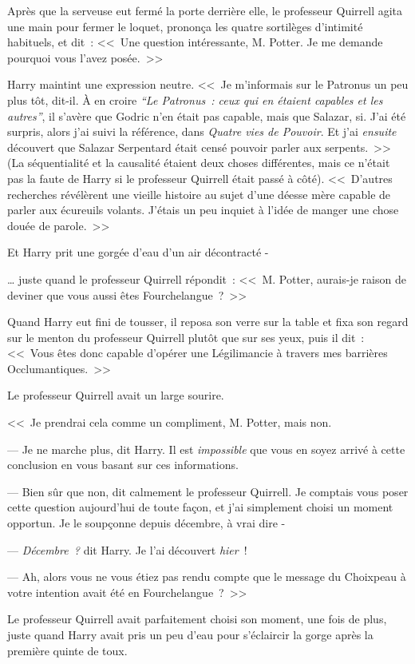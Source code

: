 Après que la serveuse eut fermé la porte derrière elle, le professeur Quirrell agita une main pour fermer le loquet, prononça les quatre sortilèges d'intimité habituels, et dit~: <<~Une question intéressante, M. Potter. Je me demande pourquoi vous l'avez posée.~>>

Harry maintint une expression neutre. <<~Je m'informais sur le Patronus un peu plus tôt, dit-il. À en croire \emph{“Le Patronus~: ceux qui en étaient capables et les autres”}, il s'avère que Godric n'en était pas capable, mais que Salazar, si. J'ai été surpris, alors j'ai suivi la référence, dans \emph{Quatre vies de Pouvoir}. Et j'ai \emph{ensuite} découvert que Salazar Serpentard était censé pouvoir parler aux serpents.~>> (La séquentialité et la causalité étaient deux choses différentes, mais ce n'était pas la faute de Harry si le professeur Quirrell était passé à côté). <<~D'autres recherches révélèrent une vieille histoire au sujet d'une déesse mère capable de parler aux écureuils volants. J'étais un peu inquiet à l'idée de manger une chose douée de parole.~>>

Et Harry prit une gorgée d'eau d'un air décontracté -

… juste quand le professeur Quirrell répondit~: <<~M. Potter, aurais-je raison de deviner que vous aussi êtes Fourchelangue~?~>>

Quand Harry eut fini de tousser, il reposa son verre sur la table et fixa son regard sur le menton du professeur Quirrell plutôt que sur ses yeux, puis il dit~: <<~Vous êtes donc capable d'opérer une Légilimancie à travers mes barrières Occlumantiques.~>>

Le professeur Quirrell avait un large sourire.

<<~Je prendrai cela comme un compliment, M. Potter, mais non.

--- Je ne marche plus, dit Harry. Il est \emph{impossible} que vous en soyez arrivé à cette conclusion en vous basant sur ces informations.

--- Bien sûr que non, dit calmement le professeur Quirrell. Je comptais vous poser cette question aujourd'hui de toute façon, et j'ai simplement choisi un moment opportun. Je le soupçonne depuis décembre, à vrai dire -

--- \emph{Décembre~?} dit Harry. Je l'ai découvert \emph{hier}~!

--- Ah, alors vous ne vous étiez pas rendu compte que le message du Choixpeau à votre intention avait été en Fourchelangue~?~>>

Le professeur Quirrell avait parfaitement choisi son moment, une fois de plus, juste quand Harry avait pris un peu d'eau pour s'éclaircir la gorge après la première quinte de toux.

